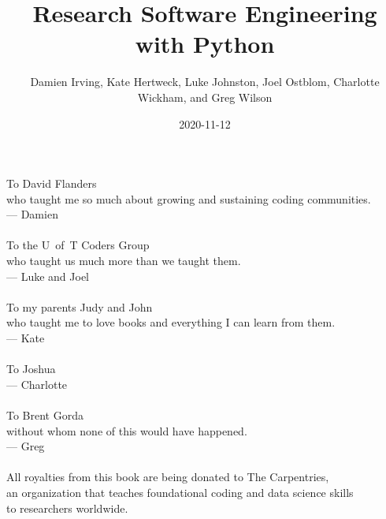 \documentclass[
]{krantz}
\title{Research Software Engineering with Python}
\author{Damien Irving, Kate Hertweck, Luke Johnston, Joel Ostblom, Charlotte Wickham, and Greg Wilson}
\date{2020-11-12}
\begin{document}
\maketitle


\thispagestyle{empty}

\begin{center}
To David Flanders\\
who taught me so much about growing and sustaining coding communities.\\
--- Damien\\

~\\

To the U~of~T Coders Group\\
who taught us much more than we taught them.\\
--- Luke and Joel\\

~\\

To my parents Judy and John\\
who taught me to love books and everything I can learn from them.\\
--- Kate\\

~\\

To Joshua\\
--- Charlotte\\

~\\

To Brent Gorda\\
without whom none of this would have happened.\\
--- Greg\\

~\\

All royalties from this book are being donated to The Carpentries,\\
an organization that teaches foundational coding and data science skills\\
to researchers worldwide.
\end{center}

\setlength{\abovedisplayskip}{-5pt}
\setlength{\abovedisplayshortskip}{-5pt}
\end{document}
